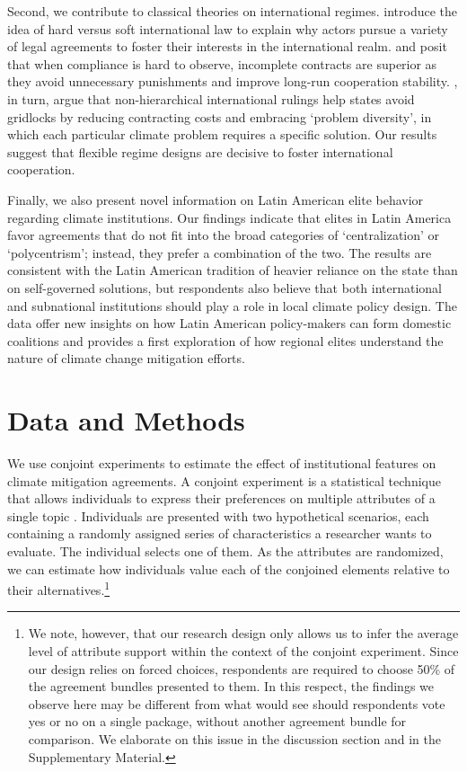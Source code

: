 \documentclass[a4paper,12pt]{article}
\begin{document}
Second, we contribute to classical theories on international regimes. \citet{abbott2000hard} introduce the idea of hard versus soft international law to explain why actors pursue a variety of legal agreements to foster their interests in the international realm. \citet{mildenberger2017beliefs} and \citet{rosendorff2001optimal} posit that when compliance is hard to observe, incomplete contracts are superior as they avoid unnecessary punishments and improve long-run cooperation stability. \citet{keohane2011regime}, in turn, argue that non-hierarchical international rulings help states avoid gridlocks by reducing contracting costs and embracing `problem diversity', in which each particular climate problem requires a specific solution. Our results suggest that flexible regime designs are decisive to foster international cooperation.

Finally, we also present novel information on Latin American elite behavior regarding climate institutions. Our findings indicate that elites in Latin America favor agreements that do not fit into the broad categories of `centralization' or `polycentrism'; instead, they prefer a combination of the two. The results are consistent with the Latin American tradition of heavier reliance on the state than on self-governed solutions, but respondents also believe that both international and subnational institutions should play a role in local climate policy design. The data offer new insights on how Latin American policy-makers can form domestic coalitions and provides a first exploration of how regional elites understand the nature of climate change mitigation efforts.

\section{Data and Methods}%
\label{sec:data_and_methods}

We use conjoint experiments to estimate the effect of institutional features on climate mitigation agreements. A conjoint experiment is a statistical technique that allows individuals to express their preferences on multiple attributes of a single topic \citep{bansak2016economic, hainmueller2014causal}. Individuals are presented with two hypothetical scenarios, each containing a randomly assigned series of characteristics a researcher wants to evaluate. The individual selects one of them. As the attributes are randomized, we can estimate how individuals value each of the conjoined elements relative to their alternatives.\footnote{We note, however, that our research design only allows us to infer the average level of attribute support within the context of the conjoint experiment. Since our design relies on forced choices, respondents are required to choose 50\% of the agreement bundles presented to them. In this respect, the findings we observe here may be different from what would see should respondents vote yes or no on a single package, without another agreement bundle for comparison. We elaborate on this issue in the discussion section and in the Supplementary Material.} 
\end{document}

